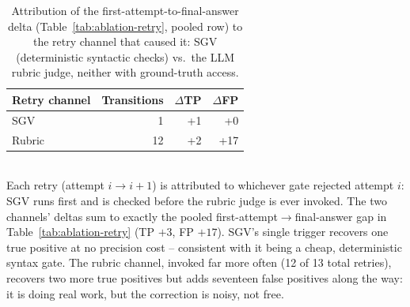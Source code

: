 \begin{table}[t]
\centering
\caption{Attribution of the first-attempt-to-final-answer delta (Table~\ref{tab:ablation-retry}, pooled row) to the retry channel that caused it: SGV (deterministic syntactic checks) vs.\ the LLM rubric judge, neither with ground-truth access.}
\label{tab:ablation-channel}
\begin{tabular}{lrrr}
\toprule
Retry channel & Transitions & $\Delta$TP & $\Delta$FP \\
\midrule
SGV     & 1  & +1 & +0  \\
Rubric  & 12 & +2 & +17 \\
\bottomrule
\end{tabular}
\\[2pt]
\footnotesize{Each retry (attempt $i \to i+1$) is attributed to whichever gate rejected attempt $i$: SGV runs first and is checked before the rubric judge is ever invoked. The two channels' deltas sum to exactly the pooled first-attempt$\to$final-answer gap in Table~\ref{tab:ablation-retry} (TP $+3$, FP $+17$). SGV's single trigger recovers one true positive at no precision cost -- consistent with it being a cheap, deterministic syntax gate. The rubric channel, invoked far more often (12 of 13 total retries), recovers two more true positives but adds seventeen false positives along the way: it is doing real work, but the correction is noisy, not free.}
\end{table}

